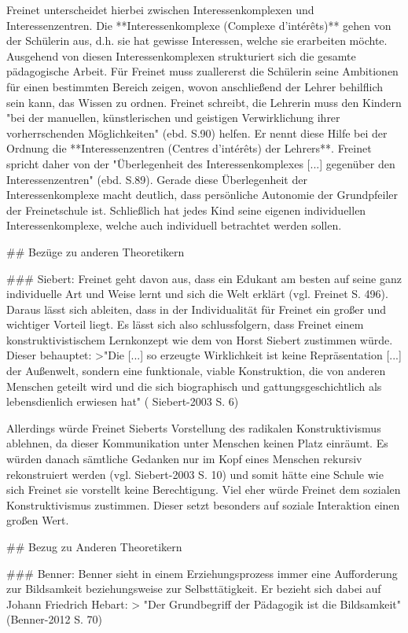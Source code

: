 Freinet unterscheidet hierbei zwischen Interessenkomplexen und Interessenzentren.
Die **Interessenkomplexe (Complexe d'intérêts)** gehen von der Schülerin aus, d.h. sie hat gewisse Interessen, welche sie erarbeiten möchte.
Ausgehend von diesen Interessenkomplexen strukturiert sich die gesamte pädagogische Arbeit.
Für Freinet muss zuallererst die Schülerin seine Ambitionen für einen bestimmten Bereich zeigen, wovon anschließend der Lehrer behilflich sein kann, das Wissen zu ordnen.
Freinet schreibt, die Lehrerin muss den Kindern "bei der manuellen, künstlerischen und geistigen Verwirklichung ihrer vorherrschenden Möglichkeiten" (ebd. S.90) helfen.
Er nennt diese Hilfe bei der Ordnung die **Interessenzentren (Centres d'intérêts) der Lehrers**.
Freinet spricht daher von der "Überlegenheit des Interessenkomplexes [...] gegenüber den Interessenzentren" (ebd. S.89).
Gerade diese Überlegenheit der Interessenkomplexe macht deutlich, dass persönliche Autonomie der Grundpfeiler der Freinetschule ist.
Schließlich hat jedes Kind seine eigenen individuellen Interessenkomplexe, welche auch individuell betrachtet werden sollen.

## Bezüge zu anderen Theoretikern

### Siebert:
Freinet geht davon aus, dass ein Edukant am besten auf seine ganz individuelle Art und Weise lernt und sich die Welt erklärt (vgl. Freinet S. 496).
Daraus lässt sich ableiten, dass in der Individualität für Freinet ein großer und wichtiger Vorteil liegt.
Es lässt sich also schlussfolgern, dass Freinet einem konstruktivistischem Lernkonzept wie dem von Horst Siebert zustimmen würde.
Dieser behauptet:
>"Die [...] so erzeugte Wirklichkeit ist keine Repräsentation [...] der Außenwelt, sondern eine funktionale, viable Konstruktion, die von anderen Menschen geteilt wird und die sich biographisch und gattungsgeschichtlich als lebensdienlich erwiesen hat" ( Siebert-2003 S. 6)
 
Allerdings würde Freinet Sieberts Vorstellung des radikalen Konstruktivismus ablehnen, da dieser Kommunikation unter Menschen keinen Platz einräumt.
Es würden danach sämtliche Gedanken nur im Kopf eines Menschen rekursiv rekonstruiert werden (vgl. Siebert-2003 S. 10) und somit hätte eine Schule wie sich Freinet sie vorstellt keine Berechtigung.
Viel eher würde Freinet dem sozialen Konstruktivismus zustimmen.
Dieser setzt besonders auf soziale Interaktion einen großen Wert.

## Bezug zu Anderen Theoretikern

### Benner:
Benner sieht in einem Erziehungsprozess immer eine Aufforderung zur Bildsamkeit beziehungsweise zur Selbsttätigkeit.
Er bezieht sich dabei auf Johann Friedrich Hebart:
> "Der Grundbegriff der Pädagogik ist die Bildsamkeit" (Benner-2012 S. 70)

